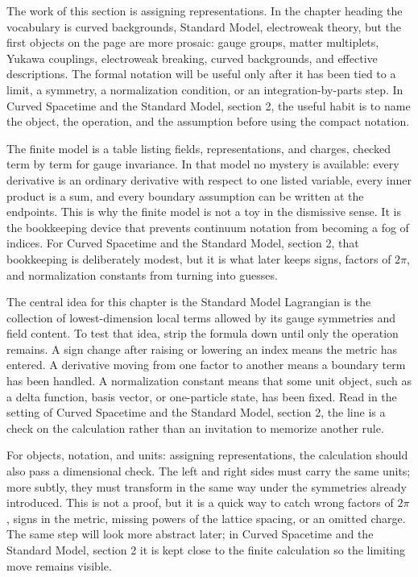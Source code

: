 The work of this section is assigning representations.  In the chapter heading the vocabulary is curved backgrounds, Standard Model, electroweak theory, but the first objects on the page are more prosaic: gauge groups, matter multiplets, Yukawa couplings, electroweak breaking, curved backgrounds, and effective descriptions.  The formal notation will be useful only after it has been tied to a limit, a symmetry, a normalization condition, or an integration-by-parts step.  In Curved Spacetime and the Standard Model, section 2, the useful habit is to name the object, the operation, and the assumption before using the compact notation.

The finite model is a table listing fields, representations, and charges, checked term by term for gauge invariance.  In that model no mystery is available: every derivative is an ordinary derivative with respect to one listed variable, every inner product is a sum, and every boundary assumption can be written at the endpoints.  This is why the finite model is not a toy in the dismissive sense.  It is the bookkeeping device that prevents continuum notation from becoming a fog of indices.  For Curved Spacetime and the Standard Model, section 2, that bookkeeping is deliberately modest, but it is what later keeps signs, factors of \(2\pi\), and normalization constants from turning into guesses.

The central idea for this chapter is the Standard Model Lagrangian is the collection of lowest-dimension local terms allowed by its gauge symmetries and field content.  To test that idea, strip the formula down until only the operation remains.  A sign change after raising or lowering an index means the metric has entered.  A derivative moving from one factor to another means a boundary term has been handled.  A normalization constant means that some unit object, such as a delta function, basis vector, or one-particle state, has been fixed.  Read in the setting of Curved Spacetime and the Standard Model, section 2, the line is a check on the calculation rather than an invitation to memorize another rule.

For objects, notation, and units: assigning representations, the calculation should also pass a dimensional check.  The left and right sides must carry the same units; more subtly, they must transform in the same way under the symmetries already introduced.  This is not a proof, but it is a quick way to catch wrong factors of \(2\pi\), signs in the metric, missing powers of the lattice spacing, or an omitted charge.  The same step will look more abstract later; in Curved Spacetime and the Standard Model, section 2 it is kept close to the finite calculation so the limiting move remains visible.

